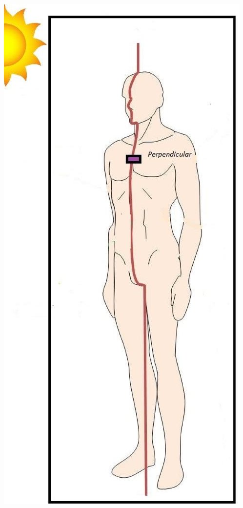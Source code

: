 \documentclass{article}
\begin{document}
\begin{multicols}{2}
\begin{minipage}{0.22\linewidth}
\includegraphics[scale=0.18]{images/cuerpo.eps}
\end{minipage}
\begin{minipage}{0.78\linewidth}
\begin{itemize}

\end{itemize}
\end{minipage}
\end{multicols}
\end{document}
